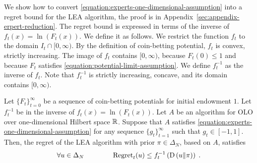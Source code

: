 We show how to convert \eqref{equation:experts-one-dimensional-assumption} into
a regret bound for the LEA algorithm, the proof is in
Appendix~\ref{sec:appendix-erpert-reduction}. The regret bound is expressed in
terms of the inverse of $f_t(x) = \ln(F_t(x))$. We define it as follows. We
restrict the function $f_t$ to the domain $I_t \cap [0, \infty)$. By the
definition of coin-betting potential, $f_t$ is convex, strictly increasing. The
image of $f_t$ contains $[0,\infty)$, because $F_t(0) \le 1$ and because $F_t$
satisfies \eqref{equation:potential-limit-assumption}. We define $f_t^{-1}$ as
the inverse of $f_t$. Note that $f_t^{-1}$ is strictly increasing, concave, and
its domain contains $[0, \infty)$.

\begin{theorem}
\label{theorem:regret-bound-experts}
Let $\{F_t\}_{t=0}^\infty$ be a sequence of coin-betting potentials for initial
endowment $1$. Let $f_t^{-1}$ be in the inverse of $f_t(x) = \ln(F_t(x))$.
Let $A$ be an algorithm for OLO over one-dimensional Hilbert space
$\mathbb{R}$. Suppose that $A$ satisfies
\eqref{equation:experts-one-dimensional-assumption} for any sequence
$\{g_t\}_{t=1}^\infty$ such that $g_t \in [-1,1]$. Then, the regret of the
LEA algorithm with prior $\pi \in \Delta_N$, based on $A$, satisfies
\[
\forall u \in \Delta_N \qquad \qquad
\operatorname{Regret}_t(u) \le f_t^{-1}\left( \operatorname*{D}\left({u}\middle\|{\pi}\right) \right) \; .
\]
\end{theorem}

